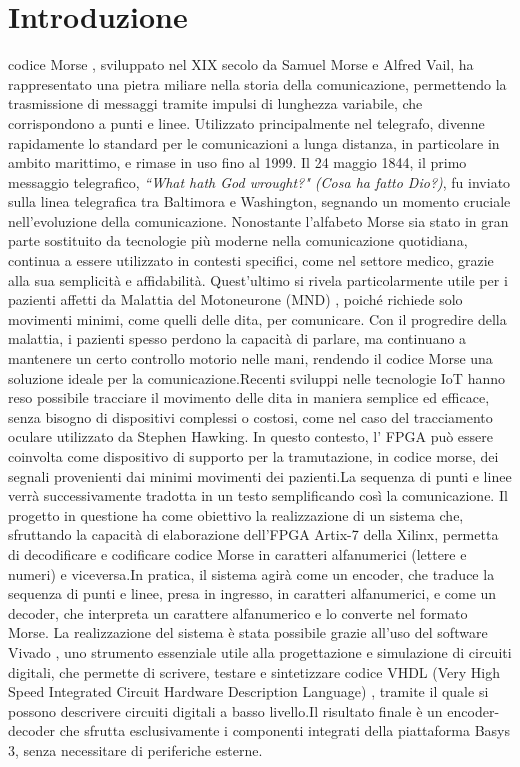 \documentclass[journal,twoside,web]{ieeecolor}
\begin{document}
\section{Introduzione}
\label{sec:introduction}
 codice Morse \cite{WikiMorse}, sviluppato nel XIX secolo da Samuel Morse e Alfred Vail, ha rappresentato una pietra miliare nella storia della comunicazione, permettendo la trasmissione di messaggi tramite impulsi di lunghezza variabile, che corrispondono a punti e linee.
Utilizzato principalmente nel telegrafo, divenne rapidamente lo standard per le comunicazioni a lunga distanza, in particolare in ambito marittimo, e rimase in uso fino al 1999. Il 24 maggio 1844, il primo messaggio telegrafico, \textit{``What hath God wrought?" (Cosa ha fatto Dio?)}, fu inviato sulla linea telegrafica tra Baltimora e Washington, segnando un momento cruciale nell'evoluzione della comunicazione.
Nonostante l'alfabeto Morse sia stato in gran parte sostituito da tecnologie più moderne nella comunicazione quotidiana, continua a essere utilizzato in contesti specifici, come nel settore medico, grazie alla sua semplicità e affidabilità. Quest'ultimo si rivela particolarmente utile per i pazienti affetti da Malattia del Motoneurone (MND) \cite{WIMORSE}, poiché richiede solo movimenti minimi, come quelli delle dita, per comunicare. Con il progredire della malattia, i pazienti spesso perdono la capacità di parlare, ma continuano a mantenere un certo controllo motorio nelle mani, rendendo il codice Morse una soluzione ideale per la comunicazione.Recenti sviluppi nelle tecnologie IoT hanno reso possibile tracciare il movimento delle dita in maniera semplice ed efficace, senza bisogno di dispositivi complessi o costosi, come nel caso del tracciamento oculare utilizzato da Stephen Hawking.
In questo contesto, l' FPGA può essere coinvolta come dispositivo di supporto per la tramutazione, in codice morse,  dei segnali provenienti dai minimi movimenti dei pazienti.La sequenza di punti e linee verrà successivamente tradotta in un testo semplificando così la comunicazione.
Il progetto in questione ha come obiettivo la realizzazione di un sistema che, sfruttando la capacità di elaborazione dell'FPGA Artix-7 della Xilinx, permetta di decodificare e codificare codice Morse in caratteri alfanumerici (lettere e numeri) e viceversa.In pratica, il sistema agirà come un encoder, che traduce la sequenza di punti e linee, presa in ingresso, in caratteri alfanumerici, e come un decoder, che interpreta un carattere alfanumerico e lo converte nel formato Morse.
La realizzazione del sistema è stata possibile grazie all’uso del software Vivado \cite{Vivado}, uno strumento essenziale utile alla progettazione e simulazione di circuiti digitali, che permette di scrivere, testare e sintetizzare codice VHDL (Very High Speed Integrated Circuit Hardware Description Language) \cite{VHDL}, tramite il quale si possono descrivere circuiti digitali a basso livello.Il risultato finale è un encoder-decoder che sfrutta esclusivamente i componenti integrati della piattaforma Basys 3, senza necessitare di periferiche esterne.\\
\end{document}
